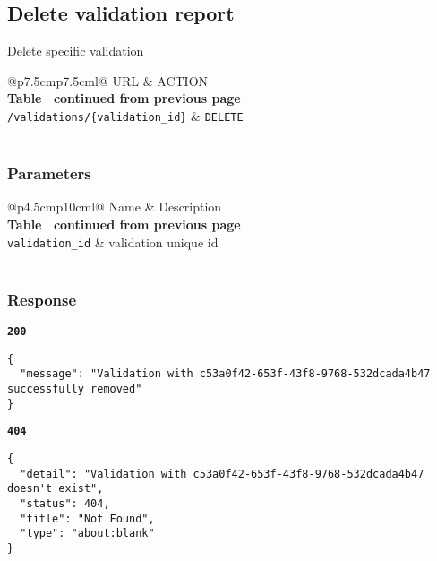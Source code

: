 \subsection{Delete validation report}
Delete specific validation

\begin{longtable}[c]{@{}p{7.5cm}p{7.5cm}l@{}}
  \toprule
  URL                                      & ACTION           \\* \midrule
  \endfirsthead
  \multicolumn{3}{c}%
  {{\bfseries Table \thetable\ continued from previous page}} \\
  \endhead
  \bottomrule
  \endfoot
  \endlastfoot
  \texttt{/validations/\{validation\_id\}} & \texttt{DELETE}  \\* \bottomrule
  \label{tab:rdf-validator-delete-validation}                 \\
\end{longtable}

\subsubsection{Parameters}
\begin{longtable}[c]{@{}p{4.5cm}p{10cm}l@{}}
  \toprule
  Name                    & Description                       \\* \midrule
  \endfirsthead
  \multicolumn{3}{c}%
  {{\bfseries Table \thetable\ continued from previous page}} \\
  \endhead
  \bottomrule
  \endfoot
  \endlastfoot
  \texttt{validation\_id} & validation unique id              \\* \bottomrule
  \label{tab:rdf-validator-delete-validation-parameters}      \\
\end{longtable}

\subsubsection{Response}
\textbf{\texttt{200}}
\begin{lstlisting}
{
  "message": "Validation with c53a0f42-653f-43f8-9768-532dcada4b47 successfully removed"
}
\end{lstlisting}

\textbf{\texttt{404}}
\begin{lstlisting}
{
  "detail": "Validation with c53a0f42-653f-43f8-9768-532dcada4b47 doesn't exist",
  "status": 404,
  "title": "Not Found",
  "type": "about:blank"
}
\end{lstlisting}

